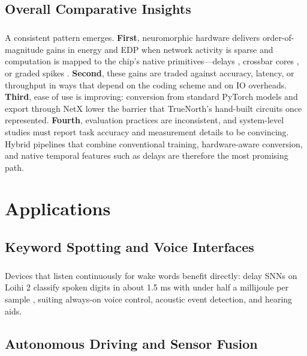 \documentclass[12pt,a4paper,final]{extreport}
\begin{document}
\section{Overall Comparative Insights}

\paragraph{} A consistent pattern emerges. \textbf{First}, neuromorphic hardware delivers order-of-magnitude gains in energy and EDP when network activity is sparse and computation is mapped to the chip's native primitives---delays \cite{p1}, crossbar cores \cite{p3}, or graded spikes \cite{p4}. \textbf{Second}, these gains are traded against accuracy, latency, or throughput in ways that depend on the coding scheme and on IO overheads. \textbf{Third}, ease of use is improving: conversion from standard PyTorch models \cite{p4} and export through NetX \cite{p1,p2} lower the barrier that TrueNorth's hand-built circuits \cite{p3} once represented. \textbf{Fourth}, evaluation practices are inconsistent, and system-level studies must report task accuracy and measurement details to be convincing. Hybrid pipelines that combine conventional training, hardware-aware conversion, and native temporal features such as delays are therefore the most promising path.

\chapter{Applications}

\section{Keyword Spotting and Voice Interfaces}

\paragraph{} Devices that listen continuously for wake words benefit directly: delay SNNs on Loihi 2 classify spoken digits in about 1.5 ms with under half a millijoule per sample \cite{p1}, suiting always-on voice control, acoustic event detection, and hearing aids.

\section{Autonomous Driving and Sensor Fusion}
\end{document}

